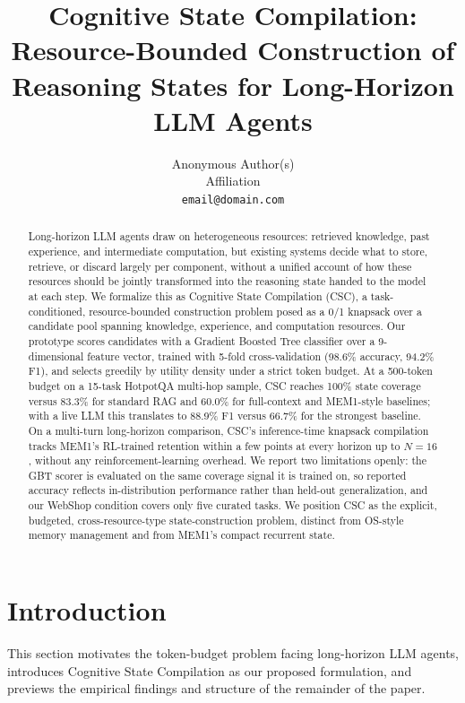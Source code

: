\documentclass{article}
\title{Cognitive State Compilation: Resource-Bounded Construction of \\ Reasoning States for Long-Horizon LLM Agents}
\author{
  Anonymous Author(s) \\
  Affiliation \\
  \texttt{email@domain.com}
}
\begin{document}
\maketitle

\begin{abstract}
Long-horizon LLM agents draw on heterogeneous resources: retrieved knowledge, past experience, and intermediate computation, but existing systems decide what to store, retrieve, or discard largely per component, without a unified account of how these resources should be jointly transformed into the reasoning state handed to the model at each step. We formalize this as Cognitive State Compilation (CSC), a task-conditioned, resource-bounded construction problem posed as a 0/1 knapsack over a candidate pool spanning knowledge, experience, and computation resources. Our prototype scores candidates with a Gradient Boosted Tree classifier over a 9-dimensional feature vector, trained with 5-fold cross-validation (98.6\% accuracy, 94.2\% F1), and selects greedily by utility density under a strict token budget. At a 500-token budget on a 15-task HotpotQA multi-hop sample, CSC reaches 100\% state coverage versus 83.3\% for standard RAG and 60.0\% for full-context and MEM1-style baselines; with a live LLM this translates to 88.9\% F1 versus 66.7\% for the strongest baseline. On a multi-turn long-horizon comparison, CSC's inference-time knapsack compilation tracks MEM1's RL-trained retention within a few points at every horizon up to $N=16$, without any reinforcement-learning overhead. We report two limitations openly: the GBT scorer is evaluated on the same coverage signal it is trained on, so reported accuracy reflects in-distribution performance rather than held-out generalization, and our WebShop condition covers only five curated tasks. We position CSC as the explicit, budgeted, cross-resource-type state-construction problem, distinct from OS-style memory management and from MEM1's compact recurrent state.
\end{abstract}

\section{Introduction}

This section motivates the token-budget problem facing long-horizon LLM agents, introduces Cognitive State Compilation as our proposed formulation, and previews the empirical findings and structure of the remainder of the paper.
\end{document}
